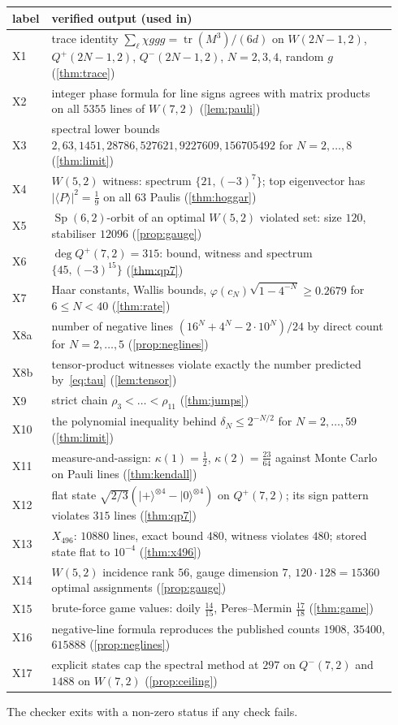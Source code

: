 \documentclass[a4paper,onecolumn,11pt,unpublished,nopdfoutputerror]{quantumarticle}
\theoremstyle{definition}
\renewcommand{\deg}{\operatorname{deg}}
\newcommand{\tr}{\operatorname{tr}}
\newcommand{\Sp}{\operatorname{Sp}}
\newcommand{\W}[1]{W(#1,2)}
\newcommand{\Qp}[1]{Q^{+}(#1,2)}
\newcommand{\Qm}[1]{Q^{-}(#1,2)}
\newcommand{\ket}[1]{\lvert #1\rangle}
\newcommand{\ev}[1]{\langle #1\rangle}
\begin{document}
{\small
\renewcommand{\arraystretch}{1.1}
\begin{longtable}{@{}>{\raggedright\arraybackslash}p{0.07\linewidth}>{\raggedright\arraybackslash}p{0.87\linewidth}@{}}
\toprule
label & verified output (used in)\\\midrule
X1 & trace identity $\sum_\ell\chi ggg=\tr(M^3)/(6d)$ on $\W{2N-1}$, $\Qp{2N-1}$, $\Qm{2N-1}$, $N=2,3,4$, random $g$ (\cref{thm:trace})\\
X2 & integer phase formula for line signs agrees with matrix products on all $5355$ lines of $\W7$ (\cref{lem:pauli})\\
X3 & spectral lower bounds $2,63,1451,28786,527621,9227609,156705492$ for $N=2,\dots,8$ (\cref{thm:limit})\\
X4 & $\W5$ witness: spectrum $\{21,(-3)^7\}$; top eigenvector has $|\ev P|^2=\frac19$ on all $63$ Paulis (\cref{thm:hoggar})\\
X5 & $\Sp(6,2)$-orbit of an optimal $\W5$ violated set: size $120$, stabiliser $12096$ (\cref{prop:gauge})\\
X6 & $\deg\Qp7=315$: bound, witness and spectrum $\{45,(-3)^{15}\}$ (\cref{thm:qp7})\\
X7 & Haar constants, Wallis bounds, $\varphi(c_N)\sqrt{1-4^{-N}}\ge0.2679$ for $6\le N<40$ (\cref{thm:rate})\\
X8a & number of negative lines $(16^N+4^N-2\cdot10^N)/24$ by direct count for $N=2,\dots,5$ (\cref{prop:neglines})\\
X8b & tensor-product witnesses violate exactly the number predicted by~\eqref{eq:tau} (\cref{lem:tensor})\\
X9 & strict chain $\rho_3<\dots<\rho_{11}$ (\cref{thm:jumps})\\
X10 & the polynomial inequality behind $\delta_N\le2^{-N/2}$ for $N=2,\dots,59$ (\cref{thm:limit})\\
X11 & measure-and-assign: $\kappa(1)=\frac12$, $\kappa(2)=\frac{23}{64}$ against Monte Carlo on Pauli lines (\cref{thm:kendall})\\
X12 & flat state $\sqrt{2/3}(\ket+^{\otimes4}-\ket0^{\otimes4})$ on $\Qp7$; its sign pattern violates $315$ lines (\cref{thm:qp7})\\
X13 & $X_{496}$: $10880$ lines, exact bound $480$, witness violates $480$; stored state flat to $10^{-4}$ (\cref{thm:x496})\\
X14 & $\W5$ incidence rank $56$, gauge dimension $7$, $120\cdot128=15360$ optimal assignments (\cref{prop:gauge})\\
X15 & brute-force game values: doily $\frac{14}{15}$, Peres--Mermin $\frac{17}{18}$ (\cref{thm:game})\\
X16 & negative-line formula reproduces the published counts $1908$, $35400$, $615888$ (\cref{prop:neglines})\\
X17 & explicit states cap the spectral method at $297$ on $\Qm7$ and $1488$ on $\W7$ (\cref{prop:ceiling})\\\bottomrule
\end{longtable}
}
The checker exits with a non-zero status if any check fails.
\end{document}
